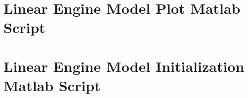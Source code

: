 \documentclass{article}
\begin{document}




\clearpage





\clearpage
\section{Linear Engine Model Plot Matlab Script}
\label{app:olplot}


\section{Linear Engine Model Initialization Matlab Script}

\end{document}
